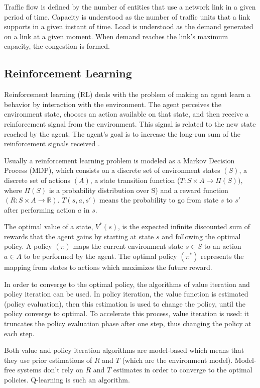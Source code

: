 \documentclass[12pt]{article}
\begin{document}
Traffic flow is defined by the number of entities that use a network link in a given period of time. Capacity is understood as the number of traffic units that a link supports in a given instant of time. Load is understood as the demand generated on a link at a given moment. When demand reaches the link's maximum capacity, the congestion is formed.

\subsection{Reinforcement Learning}

Reinforcement learning (RL) deals with the problem of making an agent learn a behavior by interaction with the environment. The agent perceives the environment state, chooses an action available on that state, and then receive a reinforcement signal from the environment. This signal is related to the new state reached by the agent. The agent's goal is to increase the long-run sum of the reinforcement signals received \cite{Kaelbling+1996}.

Usually a reinforcement learning problem is modeled as a Markov Decision Process (MDP), which consists on a discrete set of environment states $(S)$, a discrete set of actions $(A)$, a state transition function ($T: S \times A \to \Pi(S))$, where $\Pi(S)$ is a probability distribution over S) and a reward function $(R: S \times A \to \mathbb{R})$. $T(s, a, s')$ means the probability to go from state $s$ to $s'$ after performing action $a$ in $s$.

The optimal value of a state, $V^*(s)$, is the expected infinite discounted sum of rewards that the agent gains by starting at state $s$ and following the optimal policy. A policy $(\pi)$ maps the current environment state $s \in S$ to an action $a \in A$ to be performed by the agent. The optimal policy $(\pi^*)$ represents the mapping from states to actions which maximizes the future reward.

In order to converge to the optimal policy, the algorithms of value iteration and policy iteration can be used. In policy iteration, the value function is estimated (policy evaluation), then this estimation is used to change the policy, until the policy converge to optimal. To accelerate this process, value iteration is used: it truncates the policy evaluation phase after one step, thus changing the policy at each step.

Both value and policy iteration algorithms are model-based which means that they use prior estimations of $R$ and $T$ (which are the environment model). Model-free systems don't rely on $R$ and $T$ estimates in order to converge to the optimal policies. Q-learning \cite{Watkins&Dayan1992} is such an algorithm.
\end{document}
